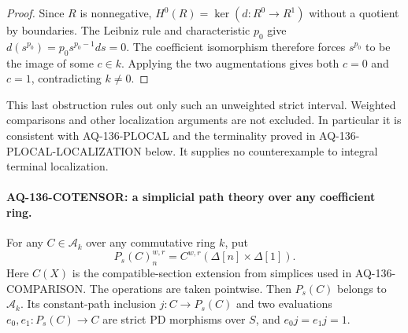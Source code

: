 \begin{proof}
Since $R$ is nonnegative, $H^0(R)=\ker(d:R^0\to R^1)$
without a quotient by boundaries.  The Leibniz rule and
characteristic $p_0$ give
$d(s^{p_0})=p_0s^{p_0-1}ds=0$.
The coefficient isomorphism therefore forces
$s^{p_0}$ to be the image of some $c\in k$.
Applying the two augmentations gives both $c=0$ and
$c=1$, contradicting $k\ne0$.
\end{proof}

This last obstruction rules out only such an unweighted
strict interval.  Weighted comparisons and other
localization arguments are not excluded.  In particular
it is consistent with AQ-136-PLOCAL and the terminality
proved in AQ-136-PLOCAL-LOCALIZATION below.  It supplies
no counterexample to integral terminal localization.


\paragraph{AQ-136-COTENSOR: a simplicial path theory over any coefficient ring.}
For any $C\in\mathcal A_k$ over any commutative ring $k$, put
\[
 P_s(C)_n^{w,r}=C^{w,r}(\Delta[n]\times\Delta[1]).             \tag{136.25}
\]
Here $C(X)$ is the compatible-section extension from simplices
used in AQ-136-COMPARISON.  The operations are taken pointwise.
Then $P_s(C)$ belongs to $\mathcal A_k$.  Its constant-path
inclusion $j:C\to P_s(C)$ and two evaluations
$e_0,e_1:P_s(C)\to C$ are strict PD morphisms over $S$,
and $e_0j=e_1j=1$.

